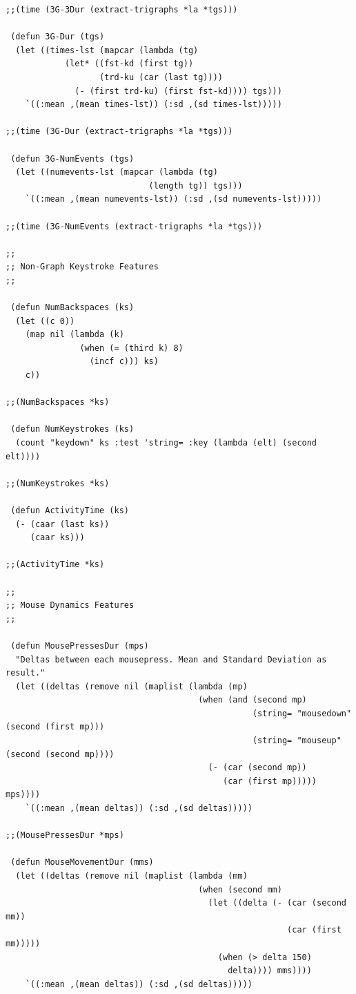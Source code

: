 \begin{lstlisting}[frame=single]
;;(time (3G-3Dur (extract-trigraphs *la *tgs)))

 (defun 3G-Dur (tgs)
  (let ((times-lst (mapcar (lambda (tg)
            (let* ((fst-kd (first tg))
                   (trd-ku (car (last tg))))
              (- (first trd-ku) (first fst-kd)))) tgs)))
    `((:mean ,(mean times-lst)) (:sd ,(sd times-lst)))))

;;(time (3G-Dur (extract-trigraphs *la *tgs)))

 (defun 3G-NumEvents (tgs)
  (let ((numevents-lst (mapcar (lambda (tg)
                             (length tg)) tgs)))
    `((:mean ,(mean numevents-lst)) (:sd ,(sd numevents-lst)))))

;;(time (3G-NumEvents (extract-trigraphs *la *tgs)))

;;
;; Non-Graph Keystroke Features
;;

 (defun NumBackspaces (ks)
  (let ((c 0))
    (map nil (lambda (k)
               (when (= (third k) 8)
                 (incf c))) ks)
    c))

;;(NumBackspaces *ks)

 (defun NumKeystrokes (ks)
  (count "keydown" ks :test 'string= :key (lambda (elt) (second elt))))

;;(NumKeystrokes *ks)

 (defun ActivityTime (ks)
  (- (caar (last ks))
     (caar ks)))

;;(ActivityTime *ks)

;;
;; Mouse Dynamics Features
;;

 (defun MousePressesDur (mps)
  "Deltas between each mousepress. Mean and Standard Deviation as result."
  (let ((deltas (remove nil (maplist (lambda (mp)
                                       (when (and (second mp)
                                                  (string= "mousedown" (second (first mp)))
                                                  (string= "mouseup" (second (second mp))))
                                         (- (car (second mp))
                                            (car (first mp))))) mps))))
    `((:mean ,(mean deltas)) (:sd ,(sd deltas)))))

;;(MousePressesDur *mps)

 (defun MouseMovementDur (mms)
  (let ((deltas (remove nil (maplist (lambda (mm)
                                       (when (second mm)
                                         (let ((delta (- (car (second mm))
                                                         (car (first mm)))))
                                           (when (> delta 150)
                                             delta)))) mms))))
    `((:mean ,(mean deltas)) (:sd ,(sd deltas)))))


\end{lstlisting}

